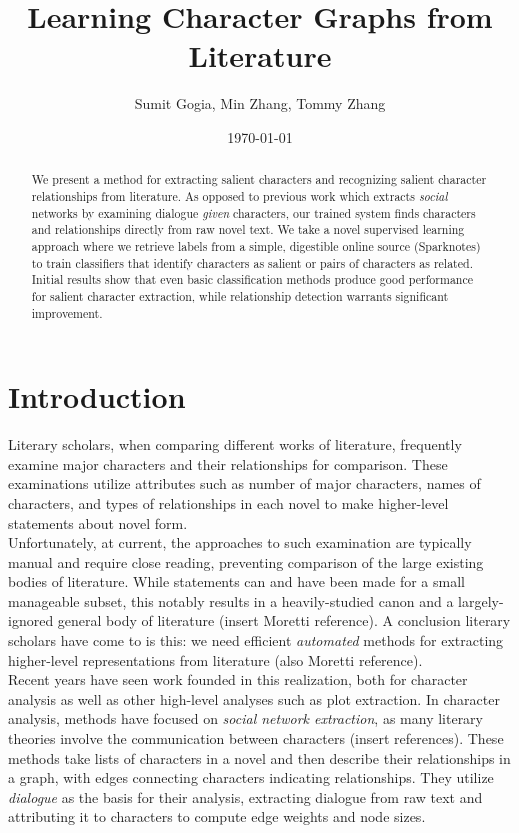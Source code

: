 \documentclass[12pt]{article}
\begin{document}
\title{Learning Character Graphs from Literature}
\author{Sumit Gogia, Min Zhang, Tommy Zhang}
\date{\today}

\maketitle

\begin{abstract}

We present a method for extracting salient characters and recognizing salient character relationships from literature. As opposed to previous work which extracts \emph{social} networks by examining dialogue \emph{given} characters, our trained system finds characters and relationships directly from raw novel text. We take a novel supervised learning approach where we retrieve labels from a simple, digestible online source (Sparknotes) to train classifiers that identify characters as salient or pairs of characters as related. Initial results show that even basic classification methods produce good performance for salient character extraction, while relationship detection warrants significant improvement. 

\end{abstract}

\section{Introduction}

Literary scholars, when comparing different works of literature, frequently examine major characters and their relationships for comparison. These examinations utilize attributes such as number of major characters, names of characters, and types of relationships in each novel to make higher-level statements about novel form. \\

Unfortunately, at current, the approaches to such examination are typically manual and require close reading, preventing comparison of the large existing bodies of literature. While statements can and have been made for a small manageable subset, this notably results in a heavily-studied canon and a largely-ignored general body of literature (insert Moretti reference). A conclusion literary scholars have come to is this: we need efficient \emph{automated} methods for extracting higher-level representations from literature (also Moretti reference). \\

Recent years have seen work founded in this realization, both for character analysis as well as other high-level analyses such as plot extraction. In character analysis, methods have focused on \emph{social network extraction}, as many literary theories involve the communication between characters (insert references). These methods take lists of characters in a novel and then describe their relationships in a graph, with edges connecting characters indicating relationships. They utilize \emph{dialogue} as the basis for their analysis, extracting dialogue from raw text and attributing it to characters to compute edge weights and node sizes. \\
\end{document}

